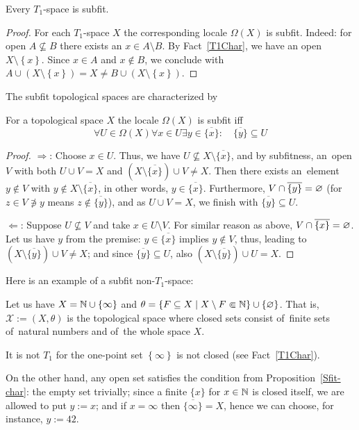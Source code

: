 \begin{thm} \label{T1->Sfit}
  Every $T_1$-space is subfit.
\end{thm}

\begin{proof}
  For each $T_1$-space $X$ the corresponding locale $\Omega(X)$ is subfit.
  Indeed: for open $A\not\subseteq B$ there exists an $x\in A \setminus B$.
  By Fact~\ref{T1Char}\thinspace, we have an open $X\setminus
  \left\{x\right\}$.
  Since $x\in A$ and $x\not\in B$, we conclude with $A\cup (X\setminus
  \left\{x\right\}) = X \ne B \cup (X\setminus \left\{x\right\})$.
\end{proof}

The subfit topological spaces are characterized by

\begin{prop} \label{Sfit-char}
  For a topological space $X$ the locale $\Omega(X)$ is subfit iff
  \[
    \forall U\in\Omega(X) \forall x\in U \exists y\in \overline{\{x\}}: \quad
    \overline{\{y\}} \subseteq U
  \]
\end{prop}
\begin{proof}
  $\Rightarrow$:
  Choose $x \in U$.
  Thus, we have $U\not\subseteq X\setminus \overline{\{x\}}$, and by
  subfitness, an~open $V$ with both $U \cup V = X$ and $(X\setminus
  \overline{\{x\}}) \cup V \ne X$.
  Then there exists an~element $y\not\in V$ with $y\not\in X\setminus
  \overline{\{x\}}$, in other words, $y\in \overline{\{x\}}$.
  Furthermore, $V \cap \overline{\{y\}} = \varnothing$ (for $z \in V \not\owns y$
  means $z\not\in \overline{\{y\}}$), and as $U \cup V = X$, we finish with
  $\overline{\{y\}} \subseteq U$.

  $\Leftarrow$:
  Suppose $U\not\subseteq V$ and take $x\in U\setminus V$.
  For similar reason as above, $V \cap \overline{\{x\}} = \varnothing$.
  Let us have $y$ from the premise:
  $y \in \overline{\{x\}}$ implies  $y\not\in V$, thus, leading to $(X\setminus
  \overline{\{y\}}) \cup V \ne X$;
  and since $\overline{\{y\}} \subseteq U$, also $(X\setminus \overline{\{y\}})
  \cup U = X$.
\end{proof}

Here is an example of a subfit non-$T_1$-space:

\begin{exmpl}
  Let us have $X = \mathbb{N} \cup \left\{\infty\right\}$ and $\theta = \left\{
  F\subseteq X \mid X\setminus F \Subset \mathbb{N} \right\} \cup \left\{ \varnothing
  \right\}$.
  That is, $\mathcal{X} := (X, \theta)$ is the topological space where closed
  sets consist of~finite sets of~natural numbers and of~the whole space $X$.

  It is not $T_1$ for the one-point set $\left\{ \infty \right\}$ is not
  closed (see Fact~\ref{T1Char}).

  On the other hand, any open set satisfies the condition from
  Proposition~\ref{Sfit-char}:
  the empty set trivially;
  since a finite $\{x\}$ for $x\in \mathbb{N}$ is closed itself, we are allowed to
  put $y := x$;
  and if $x = \infty$ then $\overline{\{ \infty \}} = X$, hence we can choose,
  for instance, $y := 42$.
\end{exmpl}

